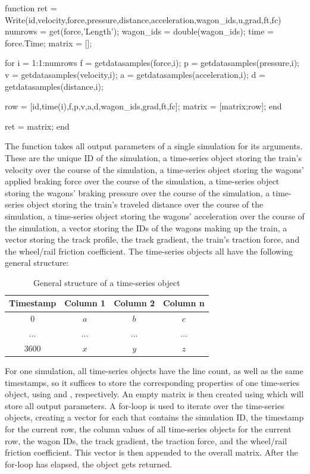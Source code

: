 \bigskip
\begin{python}
function ret = Write(id,velocity,force,pressure,distance,acceleration,wagon_ids,u,grad,ft,fc)
	numrows = get(force,'Length');
	wagon_ids = double(wagon_ids);
	time = force.Time;
	matrix = [];
	
	for i = 1:1:numrows
		f = getdatasamples(force,i);
		p = getdatasamples(pressure,i);
		v = getdatasamples(velocity,i);
		a = getdatasamples(acceleration,i);
		d = getdatasamples(distance,i);
		
		row = [id,time(i),f,p,v,a,d,wagon_ids,grad,ft,fc];
		matrix = [matrix;row];
	end
	
	ret = matrix;
end
\end{python}
\bigskip

\noindent
The  function takes all output parameters of a single simulation for its arguments. These are the unique ID of the simulation, a time-series object storing the train's velocity over the course of the simulation, a time-series object storing the wagons' applied braking force over the course of the simulation, a time-series object storing the wagons' braking pressure over the course of the simulation, a time-series object storing the train's traveled distance over the course of the simulation, a time-series object storing the wagons' acceleration over the course of the simulation, a vector storing the IDs of the wagons making up the train, a vector storing the track profile, the track gradient, the train's traction force, and the wheel/rail friction coefficient. The time-series objects all have the following general structure:

\bigskip
\begin{table}[H]
	\centering
	\begin{tabular}{c|c|c|c}
		Timestamp & Column 1 & Column 2 & Column n \\
		\hline
		0 & $a$ & $b$ & $c$ \\
		\hline
		... & ... & ... & ... \\
		\hline
		3600 & $x$ & $y$ & $z$ \\
	\end{tabular}
	\caption{General structure of a time-series object}
	\label{tab:timeseries}
\end{table}

\bigskip

\noindent
For one simulation, all time-series objects have the line count, as well as the same timestamps, so it suffices to store the corresponding properties of one time-series object, using  and , respectively. An empty matrix is then created using  which will store all output parameters. A for-loop is used to iterate over the time-series objects, creating a vector for each  that contains the simulation ID, the timestamp for the current row, the column values of all time-series objects for the current row, the wagon IDs, the track gradient, the traction force, and the wheel/rail friction coefficient. This vector is then appended to the overall matrix. After the for-loop has elapsed, the  object gets returned.

